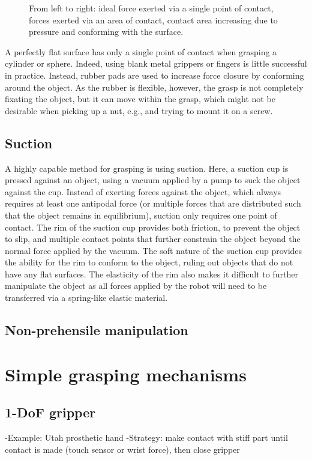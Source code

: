 \begin{figure}
\caption{From left to right: ideal force exerted via a single point of contact, forces exerted via an area of contact, contact area increasing due to pressure and conforming with the surface.\label{fig:contactarea}}
\end{figure}

A perfectly flat surface has only a single point of contact when grasping a cylinder or sphere. Indeed, using blank metal grippers or fingers is little successful in practice. Instead, rubber pads are used to increase force closure by conforming around the object. As the rubber is flexible, however, the grasp is not completely fixating the object, but it can move within the grasp, which might not be desirable when picking up a nut, e.g., and trying to mount it on a screw.

\subsection{Suction}

A highly capable method for grasping is using suction. Here, a suction cup is pressed against an object, using a vacuum applied by a pump to suck the object against the cup. Instead of exerting forces against the object, which always requires at least one antipodal force (or multiple forces that are distributed such that the object remains in equilibrium), suction only requires one point of contact. The rim of the suction cup provides both friction, to prevent the object to slip, and multiple contact points that further constrain the object beyond the normal force applied by the vacuum. The soft nature of the suction cup provides the ability for the rim to conform to the object, ruling out objects that do not have any flat surfaces. The elasticity of the rim also makes it difficult to further manipulate the object as all forces applied by the robot will need to be transferred via a spring-like elastic material.

\subsection{Non-prehensile manipulation}

\section{Simple grasping mechanisms}

\subsection{1-DoF gripper}
-Example: Utah prosthetic hand
-Strategy: make contact with stiff part until contact is made (touch sensor or wrist force), then close gripper

